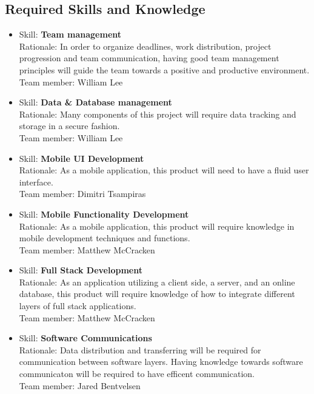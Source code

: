 \documentclass[12pt]{article}
\begin{document}
	\subsection{Required Skills and Knowledge}
	\begin{itemize}
			
		\item Skill: \textbf{Team management}
		\\ Rationale: In order to organize deadlines, work distribution, project progression and team communication, having good team management principles will guide the team towards a positive and productive environment.
		\\ Team member: William Lee
		
		\item Skill: \textbf{Data \& Database management}
		\\ Rationale: Many components of this project will require data tracking and storage in a secure fashion.
		\\ Team member: William Lee
		
		\item Skill: \textbf{Mobile UI Development}
		\\ Rationale: As a mobile application, this product will need to have a fluid user interface.
		\\ Team member: Dimitri Tsampiras
		
		\item Skill: \textbf{Mobile Functionality Development}
		\\ Rationale: As a mobile application, this product will require knowledge in mobile development techniques and functions.
		\\ Team member: Matthew McCracken

		\item Skill: \textbf{Full Stack Development}
		\\ Rationale: As an application utilizing a client side, a server, and an online database, this product will require knowledge of how to integrate different layers of full stack applications.
		\\ Team member: Matthew McCracken
		
		\item Skill: \textbf{Software Communications}
		\\ Rationale: Data distribution and transferring will be required for communication between software layers. Having knowledge towards software communicaton will be required to have efficent communication.
		\\ Team member: Jared Bentvelsen
		

\end{itemize}
\end{document}
